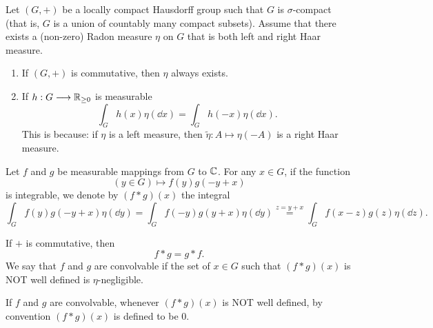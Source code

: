 Let $(G,+)$ be a locally compact Hausdorff group such that $G$ is $\sigma$-compact (that is, $G$ is a union of countably many compact subsets).
Assume that there exists a (non-zero) Radon measure $\eta$ on $G$ that is both left and right Haar measure.

\begin{remark}
    \quad
    \begin{enumerate}[label = (\roman*)]
        \item If $(G,+)$ is commutative, then $\eta$ always exists.
        \item If $h: G \longrightarrow \mathbb{R}_{\ge 0}$ is measurable
            $$\int_{G} h(x) \eta(\dd x) = \int_{G} h(- x) \eta(\dd x).$$
            This is because: if $\eta$ is a left measure, then $\tilde{\eta} : A \longmapsto \eta(-A)$ is a right Haar measure.
    \end{enumerate}
\end{remark}

\begin{definitionenv}
    Let $f$ and $g$ be measurable mappings from $G$ to $\mathbb{C}$.
    For any $x \in G$, if the function
    $$(y \in G) \longmapsto f(y) g(- y + x)$$
    is integrable, we denote by $(f * g)(x)$ the integral
    $$\int_{G} f(y) g(- y + x) \eta(\dd y) = \int_{G} f(-y) g(y + x) \eta(\dd y) \overset{z = y + x}{=} \int_{G} f(x - z) g(z) \eta(\dd z).$$
\end{definitionenv}

\begin{remark}
    If $+$ is commutative, then
    $$f*g = g*f.$$
    We say that $f$ and $g$ are convolvable if the set of $x \in G$ such that $(f*g)(x)$ is NOT well defined is $\eta$-negligible.

    \quad If $f$ and $g$ are convolvable, whenever $(f*g)(x)$ is NOT well defined, by convention $(f*g)(x)$ is defined to be $0$.
\end{remark}

